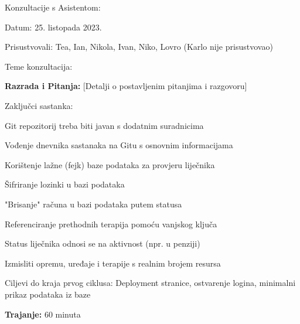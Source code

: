\begin{packed_enum}
        \item Konzultacije s Asistentom:
        \item[] \begin{packed_item}
            \item Datum: 25. listopada 2023.
            \item Prisustvovali: Tea, Ian, Nikola, Ivan, Niko, Lovro (Karlo nije prisustvovao)
            \item Teme konzultacija:
                \begin{packed_item}
                    \item \textbf{Razrada i Pitanja:} [Detalji o postavljenim pitanjima i razgovoru]
                \end{packed_item}
            \item Zaključci sastanka:
                \begin{packed_item}
                    \item Git repozitorij treba biti javan s dodatnim suradnicima
                    \item Vođenje dnevnika sastanaka na Gitu s osnovnim informacijama
                    \item Korištenje lažne (fejk) baze podataka za provjeru liječnika
                    \item Šifriranje lozinki u bazi podataka
                    \item "Brisanje" računa u bazi podataka putem statusa
                    \item Referenciranje prethodnih terapija pomoću vanjskog ključa
                    \item Status liječnika odnosi se na aktivnost (npr. u penziji)
                    \item Izmisliti opremu, uređaje i terapije s realnim brojem resursa
                    \item Ciljevi do kraja prvog ciklusa: Deployment stranice, ostvarenje logina, minimalni prikaz podataka iz baze
                \end{packed_item}
            \item \textbf{Trajanje:} 60 minuta
        \end{packed_item}
\vspace{30pt}
        

\end{packed_enum}

